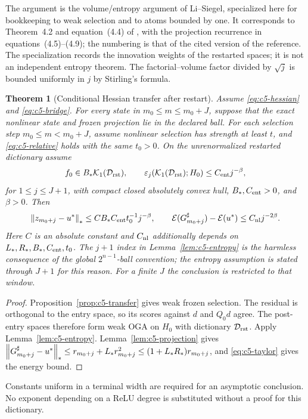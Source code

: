 \documentclass[11pt]{article}
\newtheorem{theorem}{Theorem}[section]
\theoremstyle{remark}
\begin{document}
The argument is the volume/entropy argument of Li--Siegel, specialized here
for bookkeeping to weak selection and to atoms bounded by one. It corresponds
to Theorem~4.2 and equation~(4.4) of \cite{LiSiegelEntropy2024}, with the
projection recurrence in equations~(4.5)--(4.9); the numbering is that of the
cited version of the reference. The specialization records the innovation
weights of the restarted spaces; it is not an independent entropy theorem.
The factorial--volume factor divided by $\sqrt j$ is bounded uniformly
in $j$ by Stirling's formula.

\begin{theorem}[Conditional Hessian transfer after restart]
\label{thm:c5-hessian}
Assume \eqref{eq:c5-hessian} and \eqref{eq:c5-bridge}.
For every state in $m_0\leq m\leq m_0+J$, suppose that the exact nonlinear
state and frozen projection lie in the declared ball.
For each selection step $m_0\leq m<m_0+J$, assume nonlinear selection
has strength at least $t$, and \eqref{eq:c5-relative} holds with
the same $t_0>0$. On the unrenormalized restarted dictionary assume
\begin{equation}
 f_0\in B_*\mathcal K_1(\mathcal D_{\rm rst}),\qquad
 \varepsilon_j(\mathcal K_1(\mathcal D_{\rm rst});H_0)\leq C_{\rm ent}j^{-\beta},
 \label{eq:c5-source-entropy}
\end{equation}
for $1\leq j\leq J+1$, with compact closed absolutely convex hull,
$B_*,C_{\rm ent}>0$, and $\beta>0$.
Then
\[
 \left\lVert z_{m_0+j}-u^*\right\rVert_*\leq
 C B_*C_{\rm ent}t_0^{-1}j^{-\beta},\qquad
 \mathcal E(G_{m_0+j}^\sharp)-\mathcal E(u^*)\leq C_{\rm nl}j^{-2\beta}.
\]
Here $C$ is an absolute constant and $C_{\rm nl}$ additionally depends
on $L_*,R_*,B_*,C_{\rm ent},t_0$. The \(j+1\) index in
Lemma~\ref{lem:c5-entropy} is the harmless consequence of the global
\(2^{n-1}\)-ball convention; the entropy assumption is stated through
\(J+1\) for this reason. For a finite $J$ the conclusion is restricted to
that window.
\end{theorem}
\begin{proof}
Proposition~\ref{prop:c5-transfer} gives weak frozen selection.
The residual is orthogonal to the entry space, so its scores against
$d$ and $Q_0d$ agree. The post-entry spaces therefore form weak OGA
on $H_0$ with dictionary $\mathcal D_{\rm rst}$. Apply
Lemma~\ref{lem:c5-entropy}. Lemma~\ref{lem:c5-projection} gives
$\left\lVert G_{m_0+j}^\sharp-u^*\right\rVert_*
\leq r_{m_0+j}+L_*r_{m_0+j}^2
\leq(1+L_*R_*)r_{m_0+j}$, and \eqref{eq:c5-taylor}
gives the energy bound.
\end{proof}
Constants uniform in a terminal width are required for an asymptotic
conclusion. No exponent depending on a ReLU degree is substituted
without a proof for this dictionary.
\end{document}
